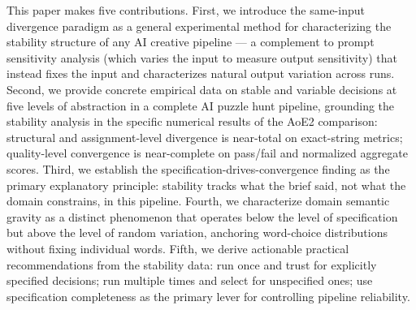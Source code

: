 This paper makes five contributions. First, we introduce the same-input divergence paradigm as a general experimental method for characterizing the stability structure of any AI creative pipeline --- a complement to prompt sensitivity analysis (which varies the input to measure output sensitivity) that instead fixes the input and characterizes natural output variation across runs. Second, we provide concrete empirical data on stable and variable decisions at five levels of abstraction in a complete AI puzzle hunt pipeline, grounding the stability analysis in the specific numerical results of the AoE2 comparison: structural and assignment-level divergence is near-total on exact-string metrics; quality-level convergence is near-complete on pass/fail and normalized aggregate scores. Third, we establish the specification-drives-convergence finding as the primary explanatory principle: stability tracks what the brief said, not what the domain constrains, in this pipeline. Fourth, we characterize domain semantic gravity as a distinct phenomenon that operates below the level of specification but above the level of random variation, anchoring word-choice distributions without fixing individual words. Fifth, we derive actionable practical recommendations from the stability data: run once and trust for explicitly specified decisions; run multiple times and select for unspecified ones; use specification completeness as the primary lever for controlling pipeline reliability.
